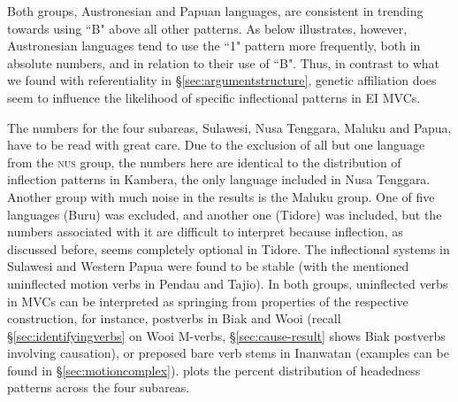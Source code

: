 Both groups, Austronesian and Papuan languages, are consistent in trending towards using ``B" above all other patterns. As  below illustrates, however, Austronesian languages tend to use the ``1" pattern more frequently, both in absolute numbers, and in relation to their use of ``B". Thus, in contrast to what we found with referentiality in §\ref{sec:argumentstructure}, genetic affiliation does seem to influence the likelihood of specific inflectional patterns in EI MVCs. 

The numbers for the four subareas, Sulawesi, Nusa Tenggara, Maluku and Papua, have to be read with great care. Due to the exclusion of all but one language from the \textsc{nus} group, the numbers here are identical to the distribution of inflection patterns in Kambera, the only language included in Nusa Tenggara. Another group with much noise in the results is the Maluku group. One of five languages (Buru) was excluded, and another one (Tidore) was included, but the numbers associated with it are difficult to interpret because inflection, as discussed before, seems completely optional in Tidore. The inflectional systems in Sulawesi and Western Papua were found to be stable (with the mentioned uninflected motion verbs in Pendau and Tajio). In both groups, uninflected verbs in MVCs can be interpreted as springing from properties of the respective construction, for instance, postverbs in Biak and Wooi (recall §\ref{sec:identifyingverbs} on Wooi M-verbs, §\ref{sec:cause-result} shows Biak postverbs involving causation), or preposed bare verb stems in Inanwatan (examples can be found in §\ref{sec:motioncomplex}).  plots the percent distribution of headedness patterns across the four subareas.

